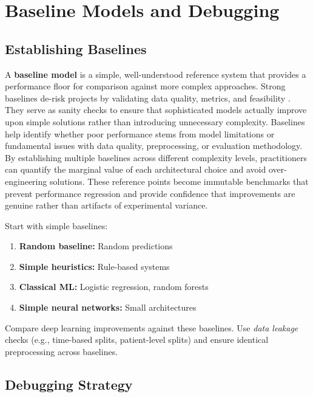 
\section{Baseline Models and Debugging }
\label{sec:baselines-debugging}

\subsection{Establishing Baselines}

A \textbf{baseline model} is a simple, well-understood reference system that provides a performance floor for comparison against more complex approaches. Strong baselines de-risk projects by validating data quality, metrics, and feasibility \textcite{GoodfellowEtAl2016,Prince2023}. They serve as sanity checks to ensure that sophisticated models actually improve upon simple solutions rather than introducing unnecessary complexity. Baselines help identify whether poor performance stems from model limitations or fundamental issues with data quality, preprocessing, or evaluation methodology. By establishing multiple baselines across different complexity levels, practitioners can quantify the marginal value of each architectural choice and avoid over-engineering solutions. These reference points become immutable benchmarks that prevent performance regression and provide confidence that improvements are genuine rather than artifacts of experimental variance. 

Start with simple baselines:
\begin{enumerate}
    \item \textbf{Random baseline:} Random predictions
    \item \textbf{Simple heuristics:} Rule-based systems
    \item \textbf{Classical ML:} Logistic regression, random forests
    \item \textbf{Simple neural networks:} Small architectures
\end{enumerate}

Compare deep learning improvements against these baselines. Use \emph{data leakage}  checks (e.g., time-based splits, patient-level splits) and ensure identical preprocessing across baselines.

\subsection{Debugging Strategy}

